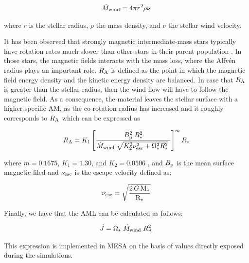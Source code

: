 \documentclass[fleqn,usenatbib]{mnras}
\begin{document}
\begin{ceqn}
\begin{equation}
    \Dot{M}_{\mathrm{wind}} = 4\pi r^2\rho\nu \label{eq:mass_loss}
\end{equation}
\end{ceqn}
where $r$ is the stellar radius, $\rho$ the mass density, and $\nu$ the stellar wind velocity.

It has been observed that strongly magnetic intermediate-mass stars typically have rotation rates much slower than other stars in their parent population \citep{Mathys2006}. In those stars, the magnetic fields interacts with the mass loss, where the Alfv\'{e}n radius plays an important role. $R_{\mathrm{A}}$ is defined as the point in which the magnetic field energy density and the kinetic energy density are balanced. In case that $R_{\mathrm{A}}$ is greater than the stellar radius, then the wind flow will have to follow the magnetic field. As a consequence, the material leaves the stellar surface with a higher specific AM, as the co-rotation radius has increased and it roughly corresponds to $R_{\mathrm{A}}$ which can be expressed as \citep{Matt2012}
\begin{ceqn}
\begin{equation}
    R_{\mathrm{A}} = K_1\left[\frac{B_{\mathrm{p}}^{2}\;R_*^{2}}{\Dot{M}_{\mathrm{wind}}\;\sqrt{K_2^2\nu_{\mathrm{esc}}^2 + \Omega_*^2R_*^{2}}\ }\right]^{m}R_*  \label{eq:mb_ralfven}
\end{equation}
\end{ceqn}
where $m =0.1675$, $K_1 = 1.30$, and $K_2 = 0.0506$ \citep{Gallet2013}, and $B_{\mathrm{p}}$ is the mean surface magnetic filed and $\nu_{\mathrm{esc}}$ is the escape velocity defined as:
\begin{ceqn}
\begin{equation}
\nu_{\mathrm{esc}} = \sqrt{\frac{2\,G\,\mathrm{M}_*}{\mathrm{R}_*}} \label{eq:vesc}
\end{equation}
\end{ceqn}
Finally, we have that the AML can be calculated as follows:
\begin{ceqn}
\begin{equation}
 \Dot{J} = \Omega_* \; \Dot{M}_{\mathrm{wind}} \; R_{\mathrm{A}}^{2} \label{eq:j_dot}
\end{equation}
\end{ceqn}
This expression is implemented in MESA on the basis of values directly exposed during the simulations.
\end{document}
